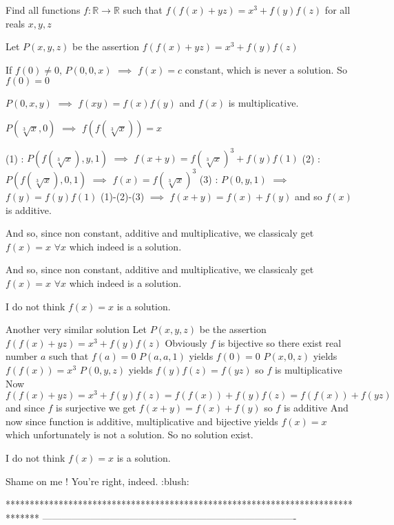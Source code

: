 \begin{solution}
	\begin{tcolorbox}Find all functions $f:\mathbb{R}\to \mathbb{R}$ such that $f(f(x)+yz)=x^3+f(y)f(z)$  for all reals $x,y,z$\end{tcolorbox}
Let $P(x,y,z)$ be the assertion $f(f(x)+yz)=x^3+f(y)f(z)$

If $f(0)\ne 0$, $P(0,0,x)$ $\implies$ $f(x)=c$ constant, which is never a solution. So $f(0)=0$

$P(0,x,y)$ $\implies$ $f(xy)=f(x)f(y)$ and $f(x)$ is multiplicative.

$P(\sqrt[3]x,0)$ $\implies$ $f(f(\sqrt[3]x))=x$

(1) : $P(f(\sqrt[3]x),y,1)$ $\implies$ $f(x+y)=f(\sqrt[3]x)^3+f(y)f(1)$
(2) : $P(f(\sqrt[3]x),0,1)$ $\implies$ $f(x)=f(\sqrt[3]x)^3$
(3) : $P(0,y,1)$ $\implies$ $f(y)=f(y)f(1)$
(1)-(2)-(3) $\implies$ $f(x+y)=f(x)+f(y)$ and so $f(x)$ is additive.

And so, since non constant, additive and multiplicative, we classicaly get $\boxed{f(x)=x}$ $\forall x$ which indeed is a solution.
\end{solution}



\begin{solution}
	\begin{tcolorbox}
And so, since non constant, additive and multiplicative, we classicaly get $\boxed{f(x)=x}$ $\forall x$ which indeed is a solution.
\end{tcolorbox}
I do not think $f(x)=x$ is a solution.

Another very similar solution
Let $P(x,y,z)$ be the assertion $f(f(x)+yz)=x^3+f(y)f(z)$
Obviously $f$ is bijective so there exist real number $a$ such that $f(a)=0$
$P(a,a,1)$ yields $f(0)=0$
$P(x,0,z)$ yields $f(f(x))=x^3$
$P(0,y,z)$ yields $f(y)f(z)=f(yz)$ so $f$ is multiplicative
Now $f(f(x)+yz)=x^3+f(y)f(z)=f(f(x))+f(y)f(z)=f(f(x))+f(yz)$ and since $f$ is surjective we get $f(x+y)=f(x)+f(y)$ so $f$ is additive
And now since function is additive, multiplicative and bijective yields $f(x)=x$ which unfortunately is not a solution. So no solution exist.
\end{solution}



\begin{solution}
	\begin{tcolorbox}I do not think $f(x)=x$ is a solution.\end{tcolorbox}
Shame on me !
You're right, indeed.   :blush:
\end{solution}
*******************************************************************************
-------------------------------------------------------------------------------

